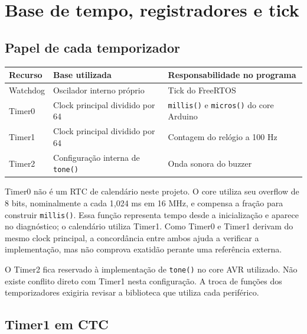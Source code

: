 \section{Base de tempo, registradores e tick}

\subsection{Papel de cada temporizador}

\begin{center}\small
\begin{tabularx}{\textwidth}{@{}YYY@{}}\toprule

\textbf{Recurso} & \textbf{Base utilizada} & \textbf{Responsabilidade no programa} \\ \midrule

Watchdog & Oscilador interno próprio & Tick do FreeRTOS \\

Timer0 & Clock principal dividido por 64 & \texttt{millis()} e \texttt{micros()} do core Arduino \\

Timer1 & Clock principal dividido por 64 & Contagem do relógio a 100 Hz \\

Timer2 & Configuração interna de \texttt{tone()} & Onda sonora do buzzer \\

\bottomrule\end{tabularx}
\end{center}

Timer0 não é um RTC de calendário neste projeto. O core utiliza seu overflow de 8 bits, nominalmente a cada 1,024 ms em 16 MHz, e compensa a fração para construir \texttt{millis()}. Essa função representa tempo desde a inicialização e aparece no diagnóstico; o calendário utiliza Timer1. Como Timer0 e Timer1 derivam do mesmo clock principal, a concordância entre ambos ajuda a verificar a implementação, mas não comprova exatidão perante uma referência externa. \autocite{fonte3}

O Timer2 fica reservado à implementação de \texttt{tone()} no core AVR utilizado. Não existe conflito direto com Timer1 nesta configuração. A troca de funções dos temporizadores exigiria revisar a biblioteca que utiliza cada periférico. \autocite{fonte4}

\subsection{Timer1 em CTC}

